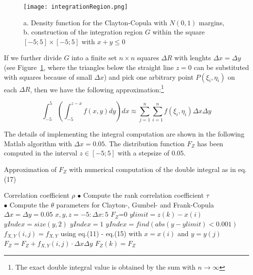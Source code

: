 \documentclass[a4paper]{article}
\begin{document}
\begin{figure}[h]
	\texttt{[image: integrationRegion.png]}
	\caption{\small a. Density function for the Clayton-Copula with $N(0,1)$ margins, b. construction of the integration region $G$ within the square $[-5;5] \times [-5;5]$ with $x+y\le 0$}
	\label{fig:integ_region}       
\end{figure}


If we further divide $G$ into a finite set $n \times n$ squares $\Delta R$ with lenghts $\Delta x = \Delta y$ (see Figure~\ref{fig:integ_region}, where the triangles below the straight line $z=0$ can be substituted with squares because of small $\Delta x$) and pick one arbitrary point $P(\xi_i,\eta_i)$ on each $\Delta R$, then we have the following approximation:\footnote{\footnotesize{The exact double integral value is obtained by the sum with $n \rightarrow \infty$}}

\begin{equation}
\int_{-5}^{5}\left(\int_{-5}^{z-x}f(x,y)dy\right)dx \approx  \sum_{j=1}^{n} \sum_{i=1}^{n}f(\xi_i,\eta_i)	 \Delta x \Delta y
\end{equation}

The details of implementing the integral computation are shown in the following Matlab algorithm with $\Delta x = 0.05$. The distribution function $F_Z$ has been computed in the interval $z \in [-5;5]$ with a stepsize of $0.05$.

\begin{algorithm}[h]
	\caption{Approximation of $F_Z$ with numerical computation of the double integral as in eq. (17)}
	\begin{algorithmic}
		\REQUIRE Correlation coefficient $\rho$  
		\STATE $\bullet$ Compute the rank correlation coefficient $\tau$ \\
		\STATE $\bullet$ Compute the $\theta$ parameters for Clayton-, Gumbel- and Frank-Copula \\
		\STATE $\Delta x = \Delta y = 0.05$
		\STATE $x, y, z =-5:\Delta x:5$
		     \STATE $F_Z$=0
		         \STATE $ylimit=z(k)-x(i)$
	            	\STATE $yIndex = size(y,2)$
		            \STATE $yIndex = 1$
		         \ELSE
		         \STATE $yIndex=find(abs(y-ylimit)<0.001)$
		         \ENDIF
	            	\STATE $f_{X,Y}(i,j)=f_{X,Y}$ using eq.(11) - eq.(15) with $x=x(i)$ and $y = y(j)$
	            	\STATE $F_Z = F_Z + f_{X,Y}(i,j)\cdot \Delta x \Delta y$
		         \ENDFOR
		      \ENDFOR
	          \STATE $F_Z(k)=F_Z$
		\ENDFOR		
	\end{algorithmic}
\end{algorithm}
\end{document}
